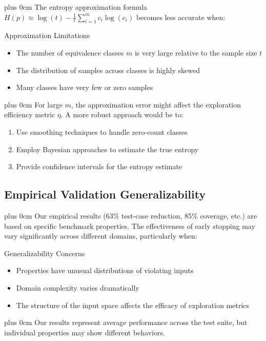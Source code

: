 \documentclass[conference]{IEEEtran}
\newcommand{\justifytext}{\leftskip=0pt \rightskip=0pt plus 0cm}
\begin{document}
\justifytext
The entropy approximation formula $H(p) \approx \log(t) - \frac{1}{t}\sum_{i=1}^{m}c_i\log(c_i)$ becomes less accurate when:

\begin{alertbox}{Approximation Limitations}
\begin{itemize}
\item The number of equivalence classes $m$ is very large relative to the sample size $t$
\item The distribution of samples across classes is highly skewed
\item Many classes have very few or zero samples
\end{itemize}
\end{alertbox}

\justifytext
For large $m$, the approximation error might affect the exploration efficiency metric $\eta$. A more robust approach would be to:

\begin{enumerate}
\item Use smoothing techniques to handle zero-count classes
\item Employ Bayesian approaches to estimate the true entropy
\item Provide confidence intervals for the entropy estimate
\end{enumerate}

\subsection{Empirical Validation Generalizability}

\justifytext
Our empirical results (63\% test-case reduction, 85\% coverage, etc.) are based on specific benchmark properties. The effectiveness of early stopping may vary significantly across different domains, particularly when:

\begin{alertbox}{Generalizability Concerns}
\begin{itemize}
\item Properties have unusual distributions of violating inputs
\item Domain complexity varies dramatically
\item The structure of the input space affects the efficacy of exploration metrics
\end{itemize}
\end{alertbox}

\justifytext
Our results represent average performance across the test suite, but individual properties may show different behaviors.
\end{document}
